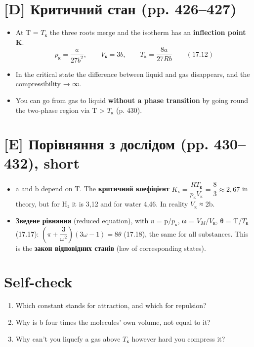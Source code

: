 \documentclass[11pt,a4paper,oneside]{book}
\begin{document}
\section*{[D] Критичний стан (pp. 426–427)}
\begin{itemize}
\item At T = $T_{\text{к}}$ the three roots merge and the isotherm has an \textbf{inflection point K}.
\[p_\text{к} = \frac a{27b^2},\qquad V_\text{к} = 3b,\qquad T_\text{к} = \frac{8a}{27Rb}\qquad(17.12)\]
\item In the critical state the difference between liquid and gas disappears, and the compressibility → ∞.
\item You can go from gas to liquid \textbf{without a phase transition} by going round the two-phase region via T > $T_{\text{к}}$ (p. 430).
\end{itemize}

\section*{[E] Порівняння з дослідом (pp. 430–432), short}
\begin{itemize}
\item a and b depend on T. The \textbf{критичний коефіцієнт} $K_\text{к} = \dfrac{RT_\text{к}}{p_\text{к}V_\text{к}} = \dfrac83 \approx 2{,}67$ in theory, but for H₂ it is 3,12 and for water 4,46. In reality $V_{\text{к}}$ ≈ 2b.
\item \textbf{Зведене рівняння} (reduced equation), with π = p/$p_{\text{к}}$, ω = $V_{M}$/$V_{\text{к}}$, θ = T/$T_{\text{к}}$ (17.17): $\left(\pi + \dfrac3{\omega^2}\right)(3\omega - 1) = 8\theta$ (17.18), the same for all substances. This is the \textbf{закон відповідних станів} (law of corresponding states).
\end{itemize}

\section*{Self-check}
\begin{enumerate}
\item Which constant stands for attraction, and which for repulsion?
\item Why is b four times the molecules' own volume, not equal to it?
\item Why can't you liquefy a gas above $T_{\text{к}}$ however hard you compress it?
\end{enumerate}
\end{document}
